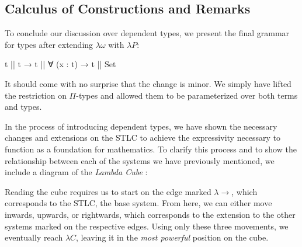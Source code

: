\documentclass[12pt]{article}
\begin{document}
\subsection*{Calculus of Constructions and Remarks}
To conclude our discussion over dependent types, we present the final grammar for
types after extending \(\lambda\omega\) with \(\lambda P\):
\begin{center}
\begin{minipage}{0.5\textwidth}
\begin{code}
t || t → t || ∀ (x : t) → t || Set
\end{code}
\end{minipage}
\end{center}
It should come with no surprise that the change is minor. We simply have lifted
the restriction on \(\Pi\)-types and allowed them to be parameterized over both
terms and types.

In the process of introducing dependent types, we have shown the necessary
changes and extensions on the STLC to achieve the expressivity necessary to
function as a foundation for mathematics. To clarify this process and to show
the relationship between each of the systems we have previously mentioned, we
include a diagram of the {\em Lambda Cube} \cite{}:
\begin{center}
\end{center}
Reading the cube requires us to start on the edge marked \(\lambda\!\!\rightarrow\),
which corresponds to the STLC, the base system. From here, we can either move
inwards, upwards, or rightwards, which corresponds to the extension to the
other systems marked on the respective edges. Using only these three movements,
we eventually reach \(\lambda C\), leaving it in the {\em most powerful}
position on the cube.
\end{document}
